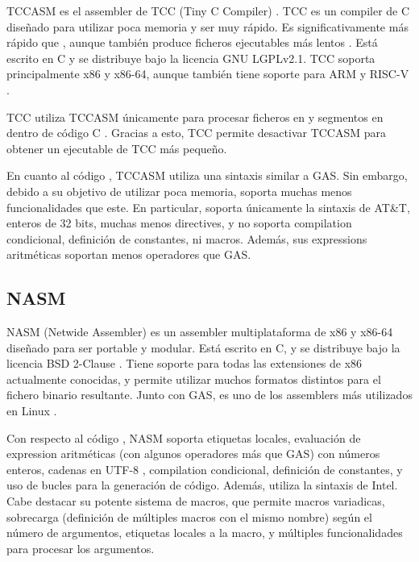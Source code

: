 TCCASM es el \gls{assembler} de TCC (Tiny C Compiler) \parencite{tcc}. TCC es un
\gls{compiler} de C diseñado para utilizar poca memoria y ser muy rápido. Es
significativamente más rápido  que
, aunque también produce ficheros ejecutables más lentos
\parencite{tcc-speed}. Está escrito en C y se distribuye bajo la licencia GNU
LGPLv2.1. TCC soporta principalmente x86 y x86-64, aunque también tiene soporte para
ARM y RISC-V \parencite{tcc-manual} \parencite{tcc-arm} \parencite{tcc-riscv}.

TCC utiliza TCCASM únicamente para procesar ficheros en
 y segmentos en 
dentro de código C \parencite{tcc-manual}. Gracias a esto, TCC permite
desactivar TCCASM para obtener un ejecutable de TCC más pequeño.

En cuanto al código , TCCASM utiliza una sintaxis
similar a \gls{GAS}. Sin embargo, debido a su objetivo de utilizar poca memoria,
soporta muchas menos funcionalidades que este. En particular, soporta únicamente
la sintaxis de AT\&T, enteros de 32 bits, muchas menos \glspl{directive}, y no
soporta \gls{compilation} condicional, definición de constantes, ni
\glspl{macro}. Además, sus \glspl{expression} aritméticas soportan menos
operadores que \gls{GAS}.

\subsection{NASM}

NASM (Netwide Assembler) \parencite{NASM} es un \gls{assembler} multiplataforma
de x86 y x86-64 diseñado para ser portable y modular. Está escrito en C, y se
distribuye bajo la licencia BSD 2-Clause \parencite{bsd-2c}. Tiene soporte para
todas las extensiones de x86 actualmente conocidas, y permite utilizar muchos
formatos distintos para el fichero binario resultante. Junto con \gls{GAS}, es
uno de los \glspl{assembler} más utilizados en Linux
\parencite{assembler-usage}.

Con respecto al código , NASM soporta etiquetas
locales, evaluación de \gls{expression} aritméticas (con algunos operadores más
que \gls{GAS}) con números enteros, cadenas en UTF-8 \parencite{UTF-8},
\gls{compilation} condicional, definición de constantes, y uso de bucles para la
generación de código. Además, utiliza la sintaxis de Intel. Cabe destacar su
potente sistema de \glspl{macro}, que permite \glspl{macro} variadicas,
sobrecarga (definición de múltiples \glspl{macro} con el mismo nombre) según el
número de argumentos, etiquetas locales a la \gls{macro}, y múltiples
funcionalidades para procesar los argumentos.

